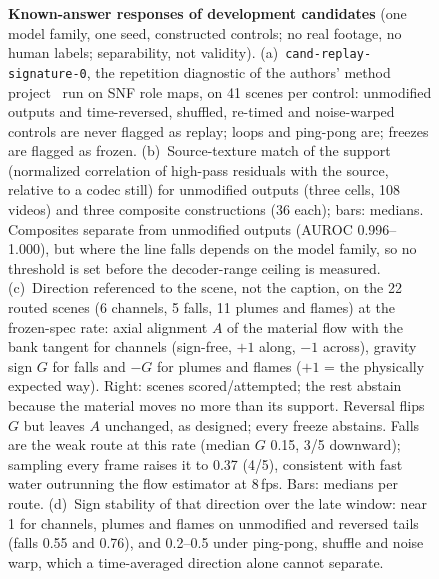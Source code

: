 \begin{figure}[t]
\caption{\textbf{Known-answer responses of development candidates} (one model family, one seed, constructed
controls; no real footage, no human labels; separability, not validity).
(a)~\texttt{cand-replay-signature-0}, the repetition diagnostic of the authors' method
project~\cite{scenetether2026} run on SNF role maps, on 41 scenes per control: unmodified outputs and
time-reversed, shuffled, re-timed and noise-warped controls are never flagged as replay; loops and
ping-pong are; freezes are flagged as frozen.
(b)~Source-texture match of the support (normalized correlation of high-pass residuals with the source,
relative to a codec still) for unmodified outputs (three cells, 108 videos) and three composite constructions
(36 each); bars: medians. Composites separate from unmodified outputs (AUROC 0.996--1.000), but where the line
falls depends on the model family, so no threshold is set before the decoder-range ceiling is measured.
(c)~Direction referenced to the scene, not the caption, on the 22 routed scenes (6 channels, 5 falls, 11 plumes
and flames) at the frozen-spec rate: axial alignment $A$ of the material flow with the bank tangent for channels
(sign-free, $+1$ along, $-1$ across), gravity sign $G$ for falls and $-G$ for plumes and flames ($+1$ = the
physically expected way). Right: scenes scored/attempted; the rest abstain because the material moves no more than
its support. Reversal flips $G$ but leaves $A$ unchanged, as designed; every freeze abstains.
Falls are the weak route at this rate (median $G$ 0.15, 3/5 downward); sampling every frame raises it to 0.37 (4/5),
consistent with fast water outrunning the flow estimator at 8\,fps. Bars: medians per route. (d)~Sign stability of
that direction over the late window: near 1 for channels, plumes and flames on unmodified and reversed tails (falls
0.55 and 0.76), and 0.2--0.5 under ping-pong, shuffle and noise warp, which a time-averaged direction alone cannot
separate.}
\label{fig:known_answers}
\end{figure}
